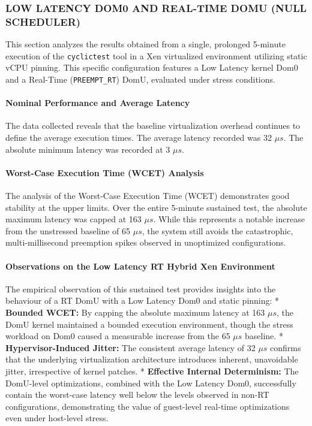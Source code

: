 \subsubsection{LOW LATENCY DOM0 AND REAL-TIME DOMU (NULL
SCHEDULER)}\label{low-latency-dom0-and-real-time-domu-null-scheduler-1}

This section analyzes the results obtained from a single, prolonged
5-minute execution of the \texttt{cyclictest} tool in a Xen virtualized
environment utilizing static vCPU pinning. This specific configuration
features a Low Latency kernel Dom0 and a Real-Time
(\texttt{PREEMPT\_RT}) DomU, evaluated under stress conditions.

\paragraph{Nominal Performance and Average
Latency}\label{nominal-performance-and-average-latency-22}

The data collected reveals that the baseline virtualization overhead
continues to define the average execution times. The average latency
recorded was 32 $\mu s$. The absolute minimum latency was recorded at 3 $\mu s$.

\paragraph{Worst-Case Execution Time (WCET)
Analysis}\label{worst-case-execution-time-wcet-analysis-24}

The analysis of the Worst-Case Execution Time (WCET) demonstrates good
stability at the upper limits. Over the entire 5-minute sustained test,
the absolute maximum latency was capped at 163 $\mu s$. While this represents
a notable increase from the unstressed baseline of 65 $\mu s$, the system
still avoids the catastrophic, multi-millisecond preemption spikes
observed in unoptimized configurations.

\paragraph{Observations on the Low Latency RT Hybrid Xen
Environment}\label{observations-on-the-low-latency-rt-hybrid-xen-environment-3}

The empirical observation of this sustained test provides insights into
the behaviour of a RT DomU with a Low Latency Dom0 and static pinning: *
\textbf{Bounded WCET:} By capping the absolute maximum latency at 163
$\mu s$, the DomU kernel maintained a bounded execution environment, though
the stress workload on Dom0 caused a measurable increase from the 65 $\mu s$
baseline. * \textbf{Hypervisor-Induced Jitter:} The consistent average
latency of 32 $\mu s$ confirms that the underlying virtualization
architecture introduces inherent, unavoidable jitter, irrespective of
kernel patches. * \textbf{Effective Internal Determinism:} The
DomU-level optimizations, combined with the Low Latency Dom0,
successfully contain the worst-case latency well below the levels
observed in non-RT configurations, demonstrating the value of
guest-level real-time optimizations even under host-level stress.

